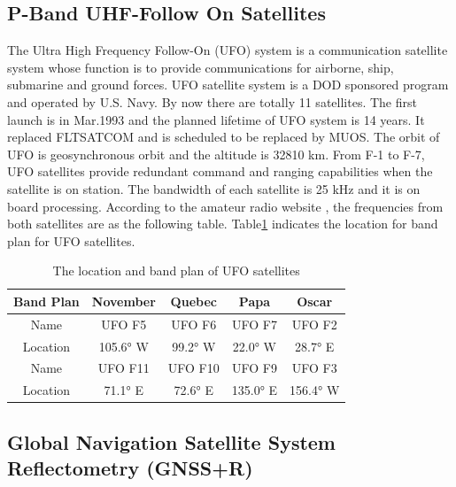 \documentclass[draftcls,onecolumn]{IEEEtran}  %
\begin{document}


\subsection{P-Band UHF-Follow On Satellites}
The Ultra High Frequency Follow-On (UFO) system is a communication satellite system whose function is to provide communications for airborne, ship, submarine and ground forces. UFO satellite system is a DOD sponsored program and operated by U.S. Navy. By now there are totally 11 satellites. The first launch is in Mar.1993 and the planned lifetime of UFO system is 14 years. It replaced FLTSATCOM and is scheduled to be replaced by MUOS. The orbit of UFO is geosynchronous orbit and the altitude is 32810 km. From F-1 to F-7, UFO satellites provide redundant command and ranging capabilities when the satellite is on station. The bandwidth of each satellite is 25 kHz and it is on board processing. According to the amateur radio website \cite{Matt:2014}, the frequencies from both satellites are as the following table. Table\ref{Table Band Plan} indicates the location for band plan for UFO satellites.

\begin{table}[ht]
\centering
\begin{tabular}  {|c|c|c|c|c|}
	\hline
     \textbf{Band Plan} & \textbf{November}	& \textbf{Quebec} &	\textbf{Papa} & \textbf{Oscar} \\
    \hline
    Name & UFO F5 & UFO F6 & UFO F7 & UFO F2 \\
    \hline
     Location &	105.6° W & 99.2° W & 	22.0° W	&  28.7° E\\
    \hline
    Name & UFO F11 & UFO F10 & UFO F9  & UFO F3 \\
    \hline
    Location& 71.1° E &	72.6° E &	135.0° E &	156.4° W \\
    \hline
\end{tabular}
\caption{The location and band plan of UFO satellites}
\label{Table Band Plan}
\end{table}

\subsection{Global Navigation Satellite System  Reflectometry (GNSS+R)}
\end{document}
